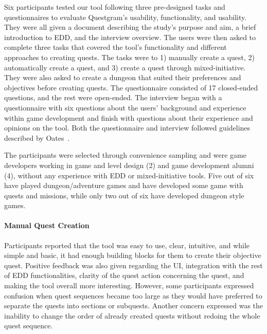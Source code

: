 
Six participants tested our tool following three pre-designed tasks and questionnaires to evaluate Questgram's usability, functionality, and usability. They were all given a document describing the study's purpose and aim, a brief introduction to EDD, and the interview overview. The users were then asked to complete three tasks that covered the tool's functionality and different approaches to creating quests. The tasks were to 1) manually create a quest, 2) automatically create a quest, and 3) create a quest through mixed-initiative. They were also asked to create a dungeon that suited their preferences and objectives before creating quests. The questionnaire consisted of 17 closed-ended questions, and the rest were open-ended. The interview began with a questionnaire with six questions about the users' background and experience within game development and finish with questions about their experience and opinions on the tool. Both the questionnaire and interview followed guidelines described by Oates~.  

The participants were selected through convenience sampling and were game developers working in game and level design (2) and game development alumni (4), without any experience with EDD or mixed-initiative tools. Five out of six have played dungeon/adventure games and have developed some game with quests and missions, while only two out of six have developed dungeon style games.

\paragraph{Manual Quest Creation}

Participants reported that the tool was easy to use, clear, intuitive, and while simple and basic, it had enough building blocks for them to create their objective quest. Positive feedback was also given regarding the UI, integration with the rest of EDD functionalities, clarity of the quest action concerning the quest, and making the tool overall more interesting. However, some participants expressed confusion when quest sequences became too large as they would have preferred to separate the quests into sections or subquests. Another concern expressed was the inability to change the order of already created quests without redoing the whole quest sequence.

